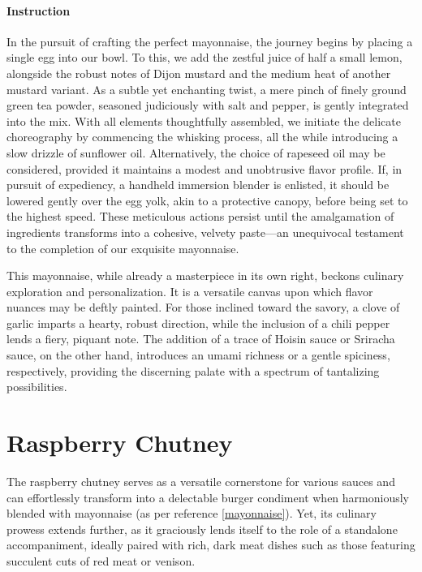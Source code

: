 \paragraph{Instruction}
In the pursuit of crafting the perfect mayonnaise, the journey begins by placing a single egg into our bowl. To this, we add the zestful juice of half a small lemon, alongside the robust notes of Dijon mustard and the medium heat of another mustard variant. As a subtle yet enchanting twist, a mere pinch of finely ground green tea powder, seasoned judiciously with salt and pepper, is gently integrated into the mix. With all elements thoughtfully assembled, we initiate the delicate choreography by commencing the whisking process, all the while introducing a slow drizzle of sunflower oil. Alternatively, the choice of rapeseed oil may be considered, provided it maintains a modest and unobtrusive flavor profile. If, in pursuit of expediency, a handheld immersion blender is enlisted, it should be lowered gently over the egg yolk, akin to a protective canopy, before being set to the highest speed. These meticulous actions persist until the amalgamation of ingredients transforms into a cohesive, velvety paste—an unequivocal testament to the completion of our exquisite mayonnaise.

This mayonnaise, while already a masterpiece in its own right, beckons culinary exploration and personalization. It is a versatile canvas upon which flavor nuances may be deftly painted. For those inclined toward the savory, a clove of garlic imparts a hearty, robust direction, while the inclusion of a chili pepper lends a fiery, piquant note. The addition of a trace of Hoisin sauce or Sriracha sauce, on the other hand, introduces an umami richness or a gentle spiciness, respectively, providing the discerning palate with a spectrum of tantalizing possibilities.

\section{Raspberry Chutney}
\label{raspberrychuttney}
The raspberry chutney serves as a versatile cornerstone for various sauces and can effortlessly transform into a delectable burger condiment when harmoniously blended with mayonnaise (as per reference \ref{mayonnaise}). Yet, its culinary prowess extends further, as it graciously lends itself to the role of a standalone accompaniment, ideally paired with rich, dark meat dishes such as those featuring succulent cuts of red meat or venison.

